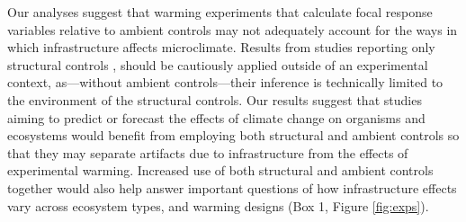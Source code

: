 \documentclass{article}
\begin{document}
\par Our analyses suggest that warming experiments that calculate focal response variables relative to ambient controls \citep[e.g.,][]{price1998,dunne2003,cleland2006,morin2010,marchin2015} may not adequately account for the ways in which infrastructure affects microclimate. Results from studies reporting only structural controls \citep [e.g.,][]{sherry2007,hoeppner2012, rollinson2012}, should be cautiously applied outside of an experimental context, as---without ambient controls---their inference is technically limited to the environment of the structural controls. Our results suggest that studies aiming to predict or forecast the effects of climate change on organisms and ecosystems would benefit from employing both structural and ambient controls so that they may separate artifacts due to infrastructure from the effects of experimental warming. Increased use of both structural and ambient controls together would also help answer important questions of how infrastructure effects vary across ecosystem types, and warming designs (Box 1, Figure \ref{fig:exps}). 
\end{document}
